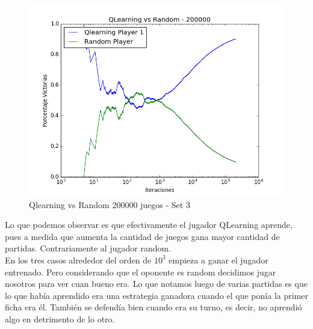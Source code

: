 \begin{figure}[h]
 \centering
 \begin{minipage}{.45\textwidth}
	\centering
	\includegraphics[scale=0.35]{img1/QlearningVsRandom_200000_6x5_cyntia.png}
        \caption{Qlearning vs Random 200000 juegos - Set 3}
  \end{minipage}
\end{figure}

 

Lo que podemos observar es que efectivamente el jugador QLearning aprende, pues a medida que aumenta la cantidad de juegos gana mayor cantidad de partidas. Contrariamente al jugador random.  \\

En los tres casos alrededor del orden de $10^{3}$ empieza a ganar el jugador entrenado. Pero considerando que el oponente es random decidimos jugar nosotros para ver cuan bueno era. Lo que notamos luego de varias partidas es que lo que había aprendido era una estrategia ganadora cuando el que ponía la primer ficha era él. Tambi\'en se defend\'ia bien cuando era su turno, es decir, no aprendi\'o algo en detrimento de lo otro.\\

